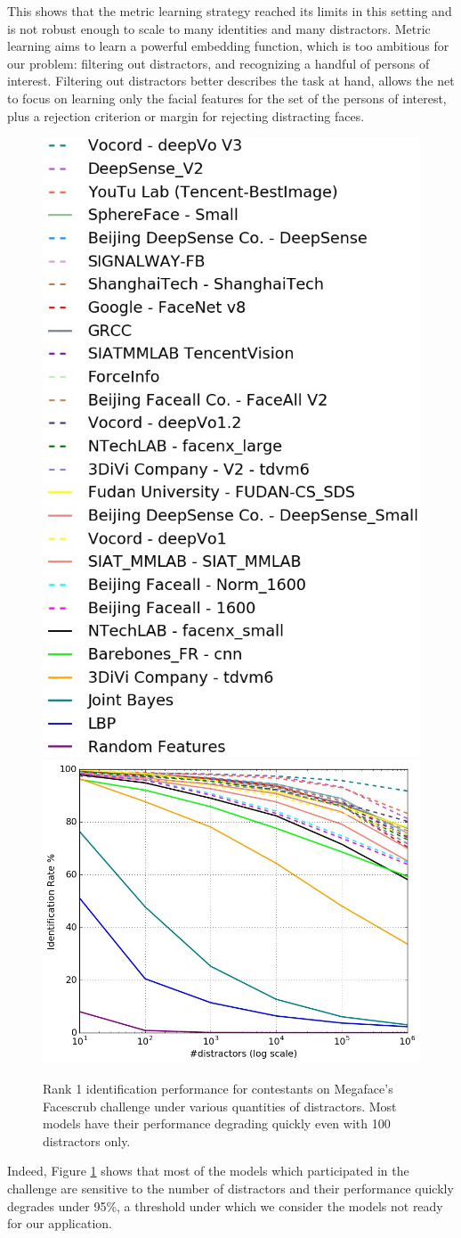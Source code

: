 This shows that the metric learning strategy reached its limits in this setting and is not robust enough to scale to many identities and many distractors. Metric learning aims to learn a powerful embedding function, which is too ambitious for our problem: filtering out distractors, and recognizing a handful of persons of interest. Filtering out distractors better describes the task at hand, allows the net to focus on learning only the facial features for the set of the persons of interest, plus a rejection criterion or margin for rejecting distracting faces.

\begin{figure}
    \centering
    \includegraphics[width=0.3\columnwidth]{50-files/CH1_Legend.png}
    \includegraphics[width=0.45\columnwidth]{50-files/facescrub_rank-1_cmbnd_set_1.jpg}
    \caption{Rank 1 identification performance for contestants on Megaface's Facescrub challenge under various quantities of distractors. Most models have their performance degrading quickly even with 100 distractors only.}
    \label{fig:megafacebad}
\end{figure}

Indeed, Figure \ref{fig:megafacebad} shows that most of the models which participated in the challenge are sensitive to the number of distractors and their performance quickly degrades under 95\%, a threshold under which we consider the models not ready for our application.

